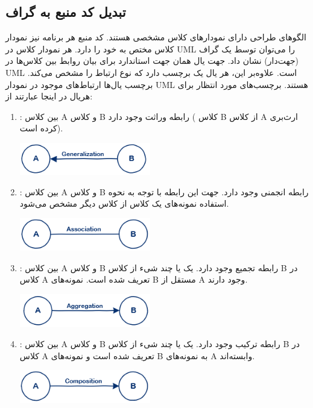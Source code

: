 \documentclass[a4paper,12pt]{article}
\begin{document}
\subsection{تبدیل کد منبع به گراف}\label{sec:code2graph}
الگوهای طراحی دارای نمودار‌های کلاس مشخصی هستند. کد منبع هر برنامه نیز نمودار کلاس مختص به خود را دارد. هر نمودار کلاس در UML را می‌توان توسط یک گراف (جهت‌دار) نشان داد. جهت یال همان جهت استاندارد برای بیان روابط بین کلاس‌ها در UML است. علاوه‌بر این، هر یال یک برچسب دارد که نوع ارتباط را مشخص می‌کند. برچسب یال‌ها ارتباط‌های موجود در نمودار UML هستند. برچسب‌های مورد انتظار برای هریال در اینجا عبارتند از:


\begin{enumerate}[.I]
	\item{
		:
		بین کلاس A و کلاس B رابطه وراثت وجود دارد ( کلاس B از کلاس  A ارث‌بری کرده است).
		
		\includegraphics[width=0.45\textwidth]{figs/fig-generalization.png}
	}

\item{
	:
	بین کلاس A و کلاس B رابطه انجمنی وجود دارد. جهت این رابطه با توجه به نحوه استفاده نمونه‌های یک کلاس از کلاس دیگر مشخص می‌شود.
	
	\includegraphics[width=0.45\textwidth]{figs/fig-association.png}
}
\item{
	:
	بین کلاس A و کلاس B رابطه تجمیع وجود دارد. یک یا چند شیء از کلاس B در کلاس A تعریف شده است. نمونه‌های B مستقل از A وجود دارند.
	
	\includegraphics[width=0.45\textwidth]{figs/fig-aggregation.png}
}

\item{
	:
	بین کلاس A و کلاس B رابطه ترکیب وجود دارد. یک یا چند شیء از کلاس B در کلاس A تعریف شده است و نمونه‌های B به نمونه‌های A وابسته‌اند.
	
	\includegraphics[width=0.45\textwidth]{figs/fig-composition.png}
}
\end{enumerate}
\end{document}
